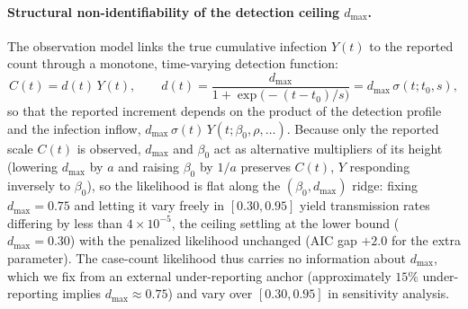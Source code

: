 \documentclass[10pt]{plos}
\begin{document}
\paragraph{Structural non-identifiability of the detection ceiling
$d_{\max}$.}
The observation model links the true cumulative infection $Y(t)$ to the
reported count through a monotone, time-varying detection function:
\begin{equation}
C(t)=d(t)\,Y(t),\qquad
d(t)=\frac{d_{\max}}{1+\exp\!\big(-(t-t_{0})/s\big)}
=d_{\max}\,\sigma(t;t_0,s),
\label{eq:ident-obs}
\end{equation}
so that the reported increment depends on the product of the
detection profile and the infection inflow,
$d_{\max}\,\sigma(t)\,Y(t;\beta_{0},\rho,\ldots)$. Because only the
reported scale $C(t)$ is observed, $d_{\max}$ and $\beta_0$ act as
alternative multipliers of its height (lowering $d_{\max}$ by $a$ and
raising $\beta_0$ by $1/a$ preserves $C(t)$, $Y$ responding inversely to
$\beta_0$), so the likelihood is flat along the $(\beta_0,d_{\max})$
ridge: fixing $d_{\max}=0.75$ and letting it vary freely in
$[0.30,0.95]$ yield transmission rates differing by less than
$4\times10^{-5}$, the ceiling settling at the lower bound
($d_{\max}=0.30$) with the penalized likelihood unchanged (AIC gap
$+2.0$ for the extra parameter). The case-count likelihood thus carries no
information about $d_{\max}$, which we fix from an external
under-reporting anchor (approximately $15\%$ under-reporting implies
$d_{\max}\approx0.75$) and vary over $[0.30,0.95]$ in sensitivity
analysis.
\end{document}
